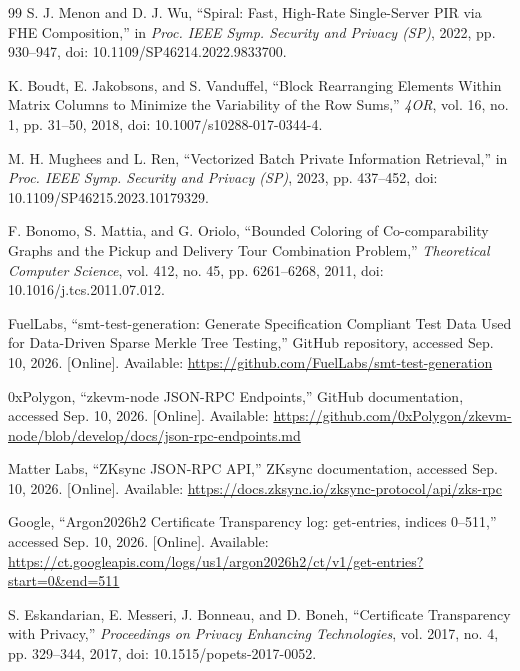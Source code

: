 \begin{thebibliography}{99}
S. J. Menon and D. J. Wu,
\newblock ``Spiral: Fast, High-Rate Single-Server PIR via FHE Composition,''
\newblock in \emph{Proc. IEEE Symp. Security and Privacy (SP)}, 2022, pp. 930--947, doi: 10.1109/SP46214.2022.9833700.

K. Boudt, E. Jakobsons, and S. Vanduffel,
\newblock ``Block Rearranging Elements Within Matrix Columns to Minimize the Variability of the Row Sums,''
\newblock \emph{4OR}, vol. 16, no. 1, pp. 31--50, 2018, doi: 10.1007/s10288-017-0344-4.

M. H. Mughees and L. Ren, ``Vectorized Batch Private Information Retrieval,'' in \emph{Proc. IEEE Symp. Security and Privacy (SP)}, 2023, pp. 437--452, doi: 10.1109/SP46215.2023.10179329.

F. Bonomo, S. Mattia, and G. Oriolo,
\newblock ``Bounded Coloring of Co-comparability Graphs and the Pickup and Delivery Tour Combination Problem,''
\newblock \emph{Theoretical Computer Science}, vol. 412, no. 45, pp. 6261--6268, 2011, doi: 10.1016/j.tcs.2011.07.012.

FuelLabs,
\newblock ``smt-test-generation: Generate Specification Compliant Test Data Used for Data-Driven Sparse Merkle Tree Testing,''
\newblock GitHub repository, accessed Sep. 10, 2026. [Online]. Available: \url{https://github.com/FuelLabs/smt-test-generation}

0xPolygon,
\newblock ``zkevm-node JSON-RPC Endpoints,''
\newblock GitHub documentation, accessed Sep. 10, 2026. [Online]. Available: \url{https://github.com/0xPolygon/zkevm-node/blob/develop/docs/json-rpc-endpoints.md}

Matter Labs,
\newblock ``ZKsync JSON-RPC API,''
\newblock ZKsync documentation, accessed Sep. 10, 2026. [Online]. Available: \url{https://docs.zksync.io/zksync-protocol/api/zks-rpc}

Google,
\newblock ``Argon2026h2 Certificate Transparency log: get-entries, indices 0--511,''
\newblock accessed Sep. 10, 2026. [Online]. Available: \url{https://ct.googleapis.com/logs/us1/argon2026h2/ct/v1/get-entries?start=0&end=511}

S. Eskandarian, E. Messeri, J. Bonneau, and D. Boneh,
\newblock ``Certificate Transparency with Privacy,''
\newblock \emph{Proceedings on Privacy Enhancing Technologies}, vol. 2017, no. 4, pp. 329--344, 2017, doi: 10.1515/popets-2017-0052.


\end{thebibliography}
